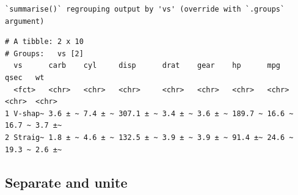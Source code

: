 \documentclass[
  11pt,
]{krantz}
\newenvironment{Shaded}{\begin{snugshade}}{\end{snugshade}}
\newcommand{\CommentTok}[1]{\textcolor[rgb]{0.37,0.37,0.37}{\textit{#1}}}
\newcommand{\DataTypeTok}[1]{\textcolor[rgb]{0.27,0.27,0.27}{#1}}
\newcommand{\KeywordTok}[1]{\textcolor[rgb]{0.27,0.27,0.27}{\textbf{#1}}}
\newcommand{\NormalTok}[1]{#1}
\newcommand{\OperatorTok}[1]{\textcolor[rgb]{0.43,0.43,0.43}{\textbf{#1}}}
\newcommand{\StringTok}[1]{\textcolor[rgb]{0.5,0.5,0.5}{#1}}
\begin{document}
\begin{Shaded}
\end{Shaded}

\begin{verbatim}
`summarise()` regrouping output by 'vs' (override with `.groups` argument)
\end{verbatim}

\begin{verbatim}
# A tibble: 2 x 10
# Groups:   vs [2]
  vs      carb    cyl     disp      drat    gear    hp      mpg    qsec   wt    
  <fct>   <chr>   <chr>   <chr>     <chr>   <chr>   <chr>   <chr>  <chr>  <chr> 
1 V-shap~ 3.6 ± ~ 7.4 ± ~ 307.1 ± ~ 3.4 ± ~ 3.6 ± ~ 189.7 ~ 16.6 ~ 16.7 ~ 3.7 ±~
2 Straig~ 1.8 ± ~ 4.6 ± ~ 132.5 ± ~ 3.9 ± ~ 3.9 ± ~ 91.4 ±~ 24.6 ~ 19.3 ~ 2.6 ±~
\end{verbatim}

\normalsize

\hypertarget{separate-unite}{%
\subsection{Separate and unite}\label{separate-unite}}
\end{document}
